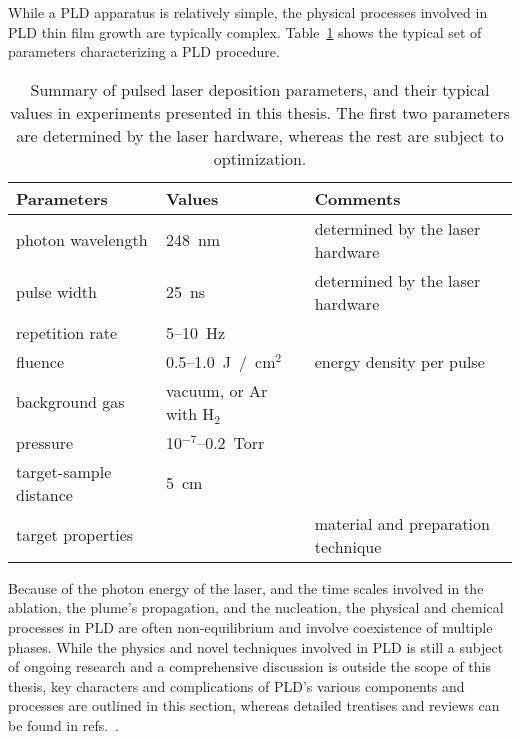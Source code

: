While a PLD apparatus is relatively simple, the physical processes involved in PLD thin film growth are typically complex. Table~\ref{tab:pld_params} shows the typical set of parameters characterizing a PLD procedure. %
%
\begin{table}[ht]%
    \centering%
    \begin{tabularx}{0.90\columnwidth}[t]{l|l|X}
    \caption[Typical pulsed laser deposition parameters.]{\label{tab:pld_params}Summary of pulsed laser deposition parameters, and their typical values in experiments presented in this thesis. The first two parameters are determined by the laser hardware, whereas the rest are subject to optimization.}\\
		\hline\hline
        Parameters & Values & Comments\\
        \hline%
        photon wavelength & 248~nm & determined by the laser hardware\\
		pulse width & 25~ns & determined by the laser hardware\\
		repetition rate & 5--10~Hz &\\
		fluence & 0.5--1.0~J~/~cm$^2$ & energy density per pulse\\
		background gas & vacuum, or Ar with H$_2$ &\\
		pressure & 10$^{-7}$--0.2~Torr &\\
        target-sample distance & 5~cm &\\
        target properties & & material and preparation technique\\
		\hline\hline
    \end{tabularx}%
\end{table}%
Because of the photon energy of the laser, and the time scales involved in the ablation, the plume's propagation, and the nucleation, the physical and chemical processes in PLD are often non-equilibrium and involve coexistence of multiple phases. While the physics and novel techniques involved in PLD is still a subject of ongoing research and a comprehensive discussion is outside the scope of this thesis, key characters and complications of PLD's various components and processes are outlined in this section, whereas detailed treatises and reviews can be found in refs.~\cite{PLD_book, PLD_review}.


